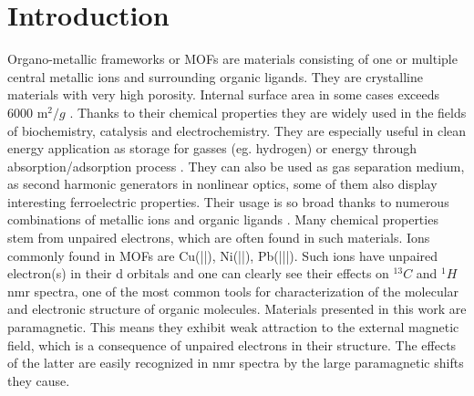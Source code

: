 \documentclass[openany, longbibliography,slovene,a4paper,12pt]{article}
\begin{document}
\section{Introduction}

Organo-metallic frameworks or MOFs are materials consisting of one or multiple
central metallic ions and surrounding organic ligands.  They are crystalline
materials with very high porosity. Internal surface area in some cases exceeds
6000 $\mathrm{m}^2/{g}$ \cite{introd_to_metal_organ_frameworks}. Thanks to their
chemical properties they are widely used in the fields of biochemistry,
catalysis and electrochemistry. They are especially useful in clean energy
application as storage for gasses (eg. hydrogen) or energy through
absorption/adsorption process \cite{introd_to_metal_organ_frameworks}. They can also be used as gas separation medium, as second harmonic generators in nonlinear optics, some of them also display interesting ferroelectric properties. Their usage is so broad thanks to numerous combinations of metallic ions and organic ligands
 \cite{introd_to_metal_organ_frameworks}  \cite{Assignment_of_Solid_State}. Many
 chemical properties stem from unpaired electrons, which are often found in such
 materials. Ions commonly found in MOFs are Cu(||), Ni(||), Pb(|||). Such ions
 have unpaired electron(s) in their d orbitals and one can clearly see their
 effects on $^{13}C$ and $^{1}H$ nmr  spectra, one of the most common tools for
 characterization of the molecular and electronic structure of organic
 molecules. Materials presented in this work are paramagnetic. This means they exhibit weak attraction to the external magnetic field, which is a consequence of unpaired electrons in their structure. The effects of the latter are easily recognized in nmr spectra by the large paramagnetic shifts they cause.
\end{document}
